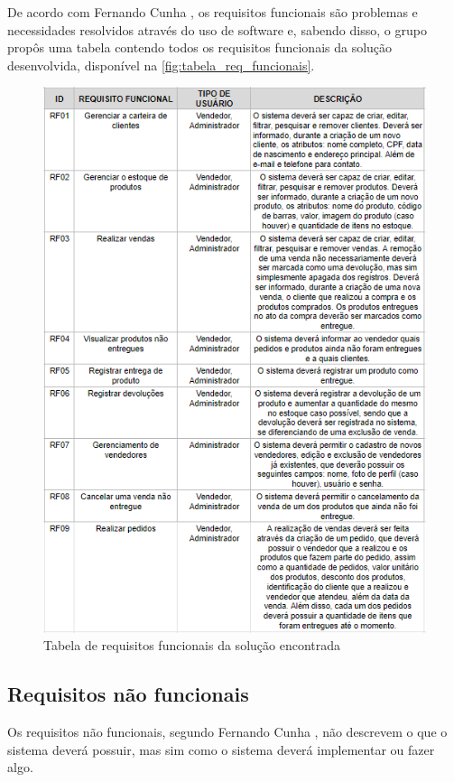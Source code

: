 \documentclass[serif, english, brazilian, oneside]{uffstex}
\begin{document}
De acordo com Fernando Cunha \cite{requisitos-o-que-sao}, os requisitos funcionais são problemas e necessidades resolvidos através do uso de software e, sabendo disso, o grupo propôs uma tabela contendo todos os requisitos funcionais da solução desenvolvida, disponível na \autoref{fig:tabela_req_funcionais}.

\newpage

\begin{figure}[!htpb]
    \centering
    \caption{Tabela de requisitos funcionais da solução encontrada}
    \label{fig:tabela_req_funcionais}
    \includegraphics[width=0.9\linewidth]{imagens/tabela_req_funcionais.png}
\end{figure}

\subsection{Requisitos não funcionais}

Os requisitos não funcionais, segundo Fernando Cunha \cite{requisitos-o-que-sao}, não descrevem o que o sistema deverá possuir, mas sim como o sistema deverá implementar ou fazer algo.
\end{document}
